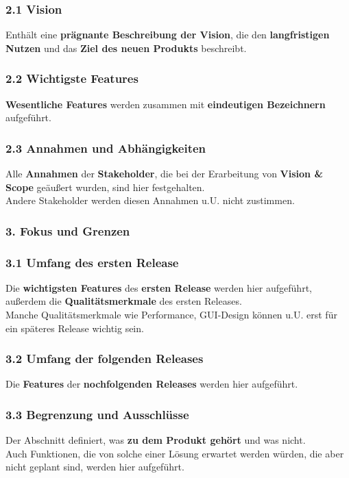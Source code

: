 \subsubsection*{2.1 Vision}
Enthält eine \textbf{prägnante Beschreibung der Vision}, die den \textbf{langfristigen Nutzen} und das \textbf{Ziel des neuen Produkts} beschreibt.

\subsubsection*{2.2 Wichtigste Features}
\textbf{Wesentliche Features} werden zusammen mit \textbf{eindeutigen Bezeichnern} aufgeführt.

\subsubsection*{2.3 Annahmen und Abhängigkeiten}
Alle \textbf{Annahmen} der \textbf{Stakeholder}, die bei der Erarbeitung von \textbf{Vision \& Scope} geäußert wurden, sind hier festgehalten.\\
Andere Stakeholder werden diesen Annahmen u.U. nicht zustimmen.

\subsubsection*{3. Fokus und Grenzen}

\subsubsection*{3.1 Umfang des ersten Release}
Die \textbf{wichtigsten Features} des \textbf{ersten Release} werden hier aufgeführt, außerdem die \textbf{Qualitätsmerkmale} des ersten Releases.\\
Manche Qualitätsmerkmale wie Performance, GUI-Design können u.U. erst für ein späteres Release wichtig sein.

\subsubsection*{3.2 Umfang der folgenden Releases}
Die \textbf{Features} der \textbf{nochfolgenden Releases} werden hier aufgeführt.

\subsubsection*{3.3 Begrenzung und Ausschlüsse}
Der Abschnitt definiert, was \textbf{zu dem Produkt gehört} und was nicht.\\
Auch Funktionen, die von  solche einer Lösung erwartet werden würden, die aber nicht geplant sind, werden hier aufgeführt.

